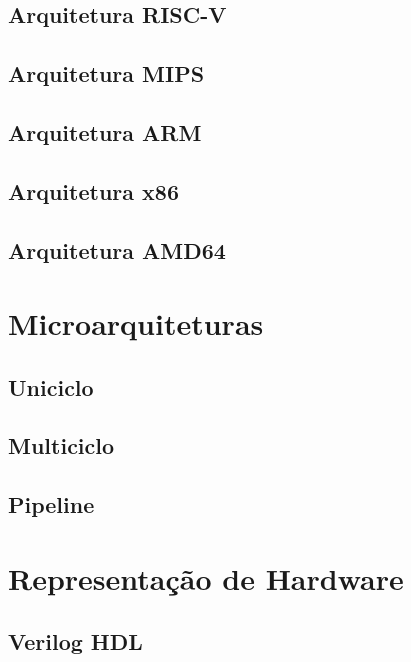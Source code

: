     \subsection{Arquitetura RISC-V}
    {}

    \subsection{Arquitetura MIPS}
    {}

    \subsection{Arquitetura ARM}
    {}

    \subsection{Arquitetura x86}
    {}

    \subsection{Arquitetura AMD64}
    {}

\section{Microarquiteturas}
{}

    \subsection{Uniciclo}
    {}

    \subsection{Multiciclo}
    {}

    \subsection{Pipeline}
    {}

\section{Representação de Hardware}
{}

    \subsection{Verilog HDL}
    {}

